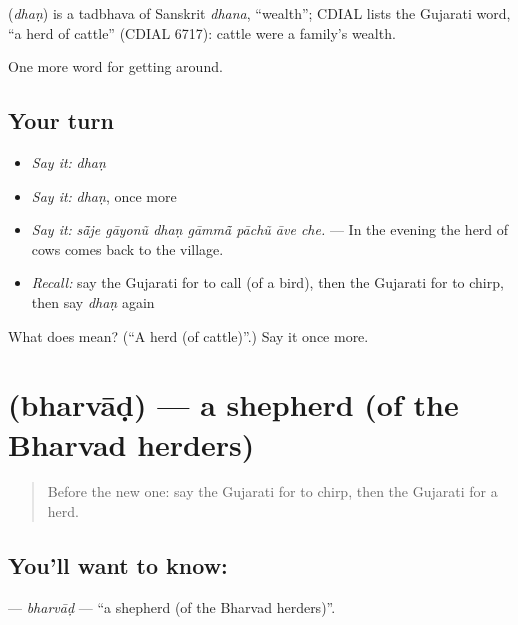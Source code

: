 \begin{cousinweb}
\textbf{} (\emph{dhaṇ}) is a tadbhava of Sanskrit \emph{dhana}, \textquotedblleft{}wealth\textquotedblright{}; CDIAL lists the Gujarati word, \textquotedblleft{}a herd of cattle\textquotedblright{} (CDIAL 6717): cattle were a family's wealth.
\end{cousinweb}

\begin{grammarlens}[title={What you've built}]
One more word for getting around.
\end{grammarlens}

\subsection*{Your turn}
\begin{itemize}
\raggedright
  \item \emph{Say it:} \emph{dhaṇ}
  \item \emph{Say it:} \emph{dhaṇ}, once more
  \item \emph{Say it:} \emph{sā̃je gāyonũ dhaṇ gāmmā̃ pāchũ āve che.} — In the evening the herd of cows comes back to the village.
  \item \emph{Recall:} say the Gujarati for to call (of a bird), then the Gujarati for to chirp, then say \emph{dhaṇ} again
\end{itemize}

\begin{tcolorbox}[breakable,colback=teal!4,colframe=teal!35!black,title={Before you move on}]
What does  mean? (\textquotedblleft{}A herd (of cattle)\textquotedblright{}.) Say it once more.
\end{tcolorbox}
\section[\texorpdfstring{\gu{ભરવાડ} (bharvāḍ)}{ભરવાડ (bharvāḍ)}]{ (bharvāḍ) — a shepherd (of the Bharvad herders)}

\label{lesson:GU-C446-bharvad}



\begin{quote}
Before the new one: say the Gujarati for to chirp, then the Gujarati for a herd.
\end{quote}

\subsection*{You'll want to know: }
\textbf{} — \emph{bharvāḍ} — \textquotedblleft{}a shepherd (of the Bharvad herders)\textquotedblright{}.

